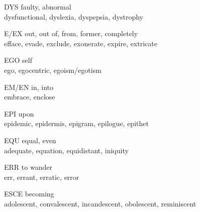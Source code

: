 \begin{flashcard}[Roots]{DYS}
faulty, abnormal\\
\vspace{0.2in}
dysfunctional, dyslexia, dyspepsia, dystrophy\\
\end{flashcard}

\begin{flashcard}[Roots]{E/EX}
out, out of, from, former, completely\\
\vspace{0.2in}
efface, evade, exclude, exonerate, expire, extricate\\
\end{flashcard}

\begin{flashcard}[Roots]{EGO}
self\\
\vspace{0.2in}
ego, egocentric, egoism/egotism\\
\end{flashcard}

\begin{flashcard}[Roots]{EM/EN}
in, into\\
\vspace{0.2in}
embrace, enclose\\
\end{flashcard}

\begin{flashcard}[Roots]{EPI}
upon\\
\vspace{0.2in}
epidemic, epidermis, epigram, epilogue, epithet\\
\end{flashcard}

\begin{flashcard}[Roots]{EQU}
equal, even\\
\vspace{0.2in}
adequate, equation, equidistant, iniquity\\
\end{flashcard}

\begin{flashcard}[Roots]{ERR}
to wander\\
\vspace{0.2in}
err, errant, erratic, error\\
\end{flashcard}

\begin{flashcard}[Roots]{ESCE}
becoming\\
\vspace{0.2in}
adolescent, convalescent, incandescent, obolescent, reminiscent\\
\end{flashcard}

